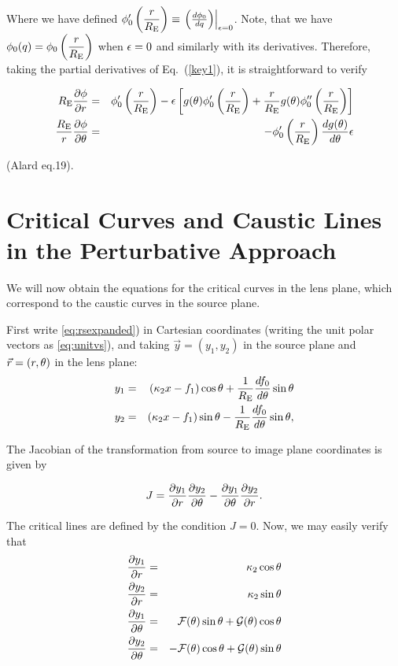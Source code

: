 Where we have defined $\phi_0^\prime\left( \dfrac{r}{R_{\mathrm{E}}}\right) \equiv  \left. \left( \frac{d\phi_0}{dq}\right) \right|_{\epsilon=0}$.  Note, that we have $\phi_0(q)=\phi_0\left( \dfrac{r}{R_{\mathrm{E}}}\right)$ when $\epsilon=0$ and similarly with its derivatives. Therefore,
taking the partial derivatives of Eq.~(\ref{key1}), it is straightforward to verify

\begin{eqnarray}
 \re\frac{\prtl \phi}{\prtl r}&=& \phi_0^\prime\prre -%
  \eps\left[g(\te)\phi_0^\prime\prre+\rre g(\te)\phi_0^{\prime \prime}\prre\right]\\
\frac{\re}{r}\frac{\prtl \phi}{\prtl \te}&=&-\phi_0^\prime\prre \frac{dg(\te)}{d\te}\eps
\end{eqnarray}

(Alard eq.19).

\section{Critical Curves and Caustic Lines in the Perturbative Approach}

We will now obtain the equations for the critical curves in the lens
plane, which correspond to the caustic curves in the source plane.

First write \eqref{eq:rsexpanded}) in Cartesian coordinates (writing
the unit polar vectors as \eqref{eq:unitvs}), and taking
$\vec{y}=(y_1,y_2)$ in the source plane and $\vec{r}=(r,\theta)$ in the
lens plane:
\begin{eqnarray}
y_{1} &=& (\kappa_2 x - f_1)\cos{\theta}+\frac{1}{R_{\mathrm{E}}}\frac{d f_0}{d\theta}\sin{\theta} \label{y_1}\\
y_{2} &=& (\kappa_2 x - f_1)\sin{\theta}-\frac{1}{R_{\mathrm{E}}}\frac{d f_0}{d\theta}\sin{\theta} \label{y_2},
\end{eqnarray}

The Jacobian of the transformation from source to image plane coordinates  is given by %

\begin{equation}
J=\frac{\partial y_1}{\partial r}\frac{\partial y_2}{\partial \theta}-\frac{\partial y_1}{\partial \theta}\frac{\partial y_2}{\partial r}.
\label{jacob}
\end{equation}

The critical lines are defined by the condition $J=0$. Now, we may easily verify that
\begin{eqnarray}
\frac{\partial y_1}{\partial r}&=& \kappa_2 \cos{\theta}\label{dy1dx}   \\
\frac{\partial y_2}{\partial r}&=& \kappa_2 \sin{\theta}\\
\frac{\partial y_1}{\partial \theta}&=& \mathcal{F}(\theta)\sin{\theta}+\mathcal{G}(\theta)\cos{\theta}\\
\frac{\partial y_2}{\partial \theta}&=& -\mathcal{F}(\theta)\cos{\theta}+\mathcal{G}(\theta)\sin{\theta}\label{dy2dte}
\end{eqnarray}

